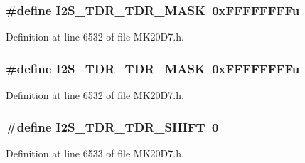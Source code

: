 \subsubsection[{\texorpdfstring{I2\+S\+\_\+\+T\+D\+R\+\_\+\+T\+D\+R\+\_\+\+M\+A\+SK}{I2S_TDR_TDR_MASK}}]{\setlength{\rightskip}{0pt plus 5cm}\#define I2\+S\+\_\+\+T\+D\+R\+\_\+\+T\+D\+R\+\_\+\+M\+A\+SK~0x\+F\+F\+F\+F\+F\+F\+F\+Fu}\hypertarget{group___i2_s___register___masks_gaa3e1fe9a61d8485d2d6968dfcf779502}{}\label{group___i2_s___register___masks_gaa3e1fe9a61d8485d2d6968dfcf779502}


Definition at line 6532 of file M\+K20\+D7.\+h.

\subsubsection[{\texorpdfstring{I2\+S\+\_\+\+T\+D\+R\+\_\+\+T\+D\+R\+\_\+\+M\+A\+SK}{I2S_TDR_TDR_MASK}}]{\setlength{\rightskip}{0pt plus 5cm}\#define I2\+S\+\_\+\+T\+D\+R\+\_\+\+T\+D\+R\+\_\+\+M\+A\+SK~0x\+F\+F\+F\+F\+F\+F\+F\+Fu}\hypertarget{group___i2_s___register___masks_gaa3e1fe9a61d8485d2d6968dfcf779502}{}\label{group___i2_s___register___masks_gaa3e1fe9a61d8485d2d6968dfcf779502}


Definition at line 6532 of file M\+K20\+D7.\+h.

\subsubsection[{\texorpdfstring{I2\+S\+\_\+\+T\+D\+R\+\_\+\+T\+D\+R\+\_\+\+S\+H\+I\+FT}{I2S_TDR_TDR_SHIFT}}]{\setlength{\rightskip}{0pt plus 5cm}\#define I2\+S\+\_\+\+T\+D\+R\+\_\+\+T\+D\+R\+\_\+\+S\+H\+I\+FT~0}\hypertarget{group___i2_s___register___masks_gacf46b25f4f14b34413430bc2071c1a13}{}\label{group___i2_s___register___masks_gacf46b25f4f14b34413430bc2071c1a13}


Definition at line 6533 of file M\+K20\+D7.\+h.

